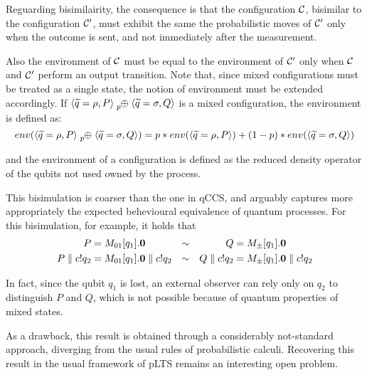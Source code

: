 Reguarding bisimilairity, the consequence is that the configuration $\mathcal{C}$, bisimilar to the configuration $\mathcal{C}'$, must exhibit the same the probabilistic moves of $\mathcal{C}'$ only when the outcome is sent, and not immediately after the measurement.

Also the environment of $\mathcal{C}$ must be equal to the environment of $\mathcal{C}'$ only when $\mathcal{C}$ and $\mathcal{C}'$ perform an output transition. Note that, since mixed configurations must be treated as a single state, the notion of environment must be extended accordingly. If $\confw{\widetilde{q} = \rho, P} \psum{p} \confw{\widetilde{q} = \sigma, Q}$ is a mixed configuration, the environment is defined as:
\[env(\confw{\widetilde{q} = \rho, P} \psum{p} \confw{\widetilde{q} = \sigma, Q}) = p*env(\confw{\widetilde{q} = \rho, P}) + (1-p)*env(\confw{\widetilde{q} = \sigma, Q})\]

and the environment of a configuration is defined as the reduced density operator of the qubits not used owned by the process.

This bisimulation is coarser than the one in qCCS, and arguably captures more appropriately the expected behevioural equivalence of quantum processes. For this bisimulation, for example, it holds that 
\begin{align*}
 P &= M_{01}[q_1].\mathbf{0} &\sim & & Q &= M_\pm[q_1].\mathbf{0} \\ 
 P \parallel c!q_2 &=  M_{01}[q_1].\mathbf{0} \parallel c!q_2 &\sim & & Q \parallel c!q_2 &=  M_\pm[q_1].\mathbf{0} \parallel c!q_2 
\end{align*} 

In fact, since the qubit $q_1$ is lost, an external observer can rely only on $q_2$ to distinguish $P$ and $Q$, which is not possible because of quantum properties of mixed states. 

As a drawback, this result is obtained through a considerably not-standard approach, diverging from the usual rules of probabilistic calculi. Recovering this result in the usual framework of pLTS remains an interesting open problem.
